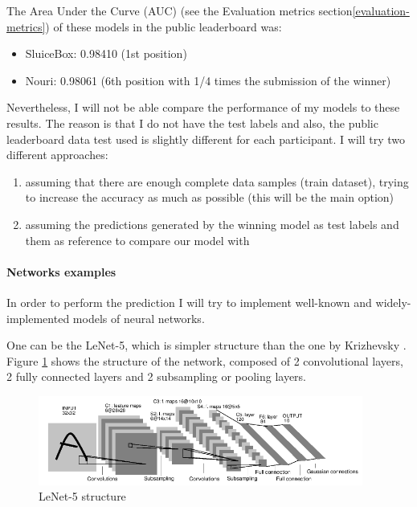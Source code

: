 \documentclass[]{article}
\begin{document}
The Area Under the Curve (AUC) (see the Evaluation metrics section\ref{evaluation-metrics}) of these models in the public leaderboard was:
\begin{itemize}
	\item SluiceBox: 0.98410 (1st position)
	\item Nouri: 0.98061 (6th position with 1/4 times the submission of the winner)
\end{itemize}

Nevertheless, I will not be able compare the performance of my models to these results. The reason is that I do not have the test labels and also, the public leaderboard data test used is slightly different for each participant. I will try two different approaches:
\begin{enumerate}
	\item assuming that there are enough complete data samples (train dataset), trying to increase the accuracy as much as possible (this will be the main option)
	\item assuming the predictions generated by the winning model as test labels and them as reference to compare our model with
\end{enumerate}

\paragraph*{Networks examples} In order to perform the prediction I will try to implement well-known and widely-implemented models of neural networks.

One can be the LeNet-5, which is simpler structure than the one by Krizhevsky \cite{Krizhevsky12}. Figure \ref{img:lenet5} shows the structure of the network, composed of 2 convolutional layers, 2 fully connected layers and 2 subsampling or pooling layers.
\pagebreak
\begin{figure}[htpb!]
\centering
\includegraphics[width= 0.95\textwidth]{images/lenet5}
\caption{LeNet-5 structure \cite{Lecun98} \label{img:lenet5}}
\end{figure}
\end{document}
